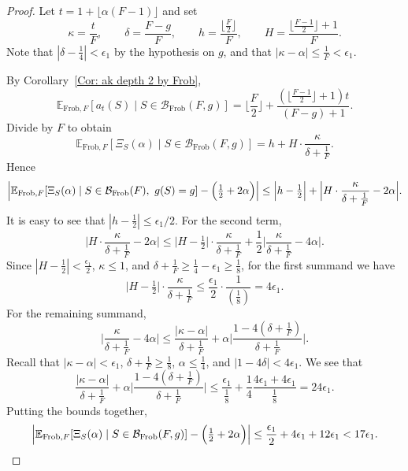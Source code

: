 \documentclass[12pt]{amsart}
\def\B{{\mathcal B}}
\def\E{{\mathbb E}}
\newcommand{\Frob}{\text{Frob}}
\begin{document}
\begin{proof}
Let $t=1+\lfloor \alpha(F-1)\rfloor$ and set
\[
\kappa=\frac{t}{F},\qquad \delta=\frac{F-g}{F},\qquad h=\frac{\lfloor\frac{F}{2}\rfloor}{F},\qquad H=\frac{\lfloor\frac{F-1}{2}\rfloor+1}{F}.
\]
Note that $|\delta-\frac{1}{4}|< \epsilon_1$ by the hypothesis on $g$, and that $|\kappa-\alpha|\leq\frac{1}{F} <\epsilon_1 $.

By Corollary~\ref{Cor: ak depth 2 by Frob},
\[
\E_{\Frob,F}[a_t(S)\mid S\in \mathcal B_{\Frob}(F,g)]
=\Big\lfloor\frac{F}{2}\Big\rfloor+\frac{(\lfloor\frac{F-1}{2}\rfloor+1)t}{(F-g)+1}.
\]
Divide by $F$ to obtain
\[
\E_{\Frob,F}[\Xi_S(\alpha)\mid S\in \mathcal B_{\Frob}(F,g)]
=h+H\cdot\frac{\kappa}{\delta+\tfrac{1}{F}}.
\]
Hence
\[
\Bigl|\E_{\Frob,F}[\Xi_S(\alpha)\mid S\in \mathcal B_{\Frob}(F),\ g(S)=g]-\Big(\tfrac12+2\alpha\Big)\Bigr|
\le \Big|h-\tfrac12\Big|
+\Big|H\cdot\frac{\kappa}{\delta+\tfrac{1}{F}}-2\alpha\Big|.
\]
It is easy to see that $|h-\frac{1}{2}| \le \epsilon_1/2$. For the second term,
\[
\Big|H\cdot\frac{\kappa}{\delta+\tfrac{1}{F}}-2\alpha\Big|
\leq \Big|H-\tfrac12\Big|\cdot \frac{\kappa}{\delta+\tfrac{1}{F}}
+\frac12\Big|\frac{\kappa}{\delta+\tfrac{1}{F}}-4\alpha\Big|.
\]
Since $|H-\tfrac12|< \tfrac{\epsilon_1}{2}$, $\kappa\leq 1$, and $\delta +\frac{1}{F}\ge \frac{1}{4}-\epsilon_1\geq \frac{1}{8}$, for the first summand we have
\[
\Big|H-\tfrac12\Big|\cdot \frac{\kappa}{\delta+\tfrac{1}{F}}
\leq \frac{\epsilon_1}{2} \cdot \frac{1}{\left(\frac{1}{8}\right)}= 4\epsilon_1.
\]
For the remaining summand,
\[
\Big|\frac{\kappa}{\delta+\tfrac{1}{F}}-4\alpha\Big|
\le \frac{|\kappa-\alpha|}{\delta+\tfrac{1}{F}}
+\alpha\Big|\frac{1-4(\delta+\frac{1}{F})}{\delta+\tfrac{1}{F}}\Big|.
\]
Recall that $|\kappa-\alpha|< \epsilon_1$, $\delta+\tfrac{1}{F}\geq \frac{1}{8}$, $\alpha\leq \frac{1}{4}$, and $|1-4\delta|< 4\epsilon_1$.  We see that
\[
\frac{|\kappa-\alpha|}{\delta+\tfrac{1}{F}}
+\alpha\Big|\frac{1-4(\delta+\frac{1}{F})}{\delta+\tfrac{1}{F}}\Big|
\leq \frac{\epsilon_1}{\frac{1}{8}} + \frac{1}{4} \frac{4\epsilon_1 +4\epsilon_1}{\frac{1}{8}}
=24\epsilon_1.
\]
Putting the bounds together,
\[
\Bigl|\E_{\Frob,F}[\Xi_S(\alpha)\mid S\in \B_{\Frob}(F,g)]-\Big(\tfrac12+2\alpha\Big)\Bigr|
\le \frac{\epsilon_1}{2}+4\epsilon_1+12\epsilon_1
< 17 \epsilon_1.
\]


\end{proof}
\end{document}
